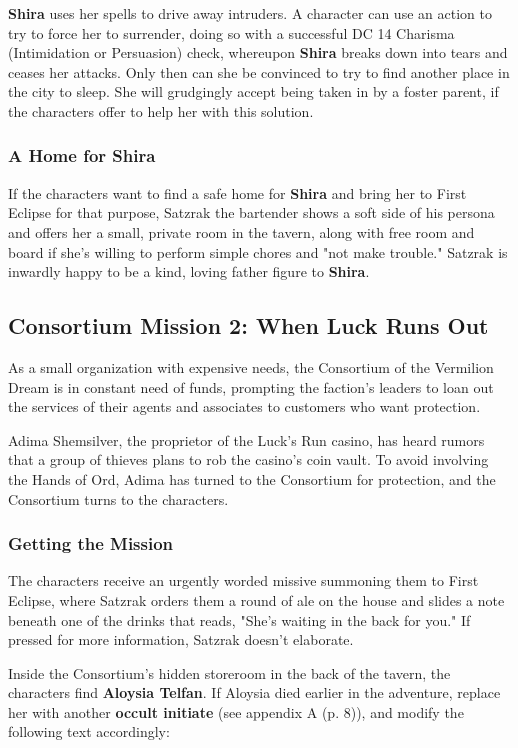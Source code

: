 \documentclass[a4paper, 11pt, bg=full, twocolumn, nooutline]{dndbook}
\begin{document}
\textbf{Shira} uses her spells to drive away intruders. A character can use an action to try to force her to surrender, doing so with a successful DC 14 Charisma (Intimidation or Persuasion) check, whereupon \textbf{Shira} breaks down into tears and ceases her attacks. Only then can she be convinced to try to find another place in the city to sleep. She will grudgingly accept being taken in by a foster parent, if the characters offer to help her with this solution.

\subsubsection{A Home for Shira}

If the characters want to find a safe home for \textbf{Shira} and bring her to First Eclipse for that purpose, Satzrak the bartender shows a soft side of his persona and offers her a small, private room in the tavern, along with free room and board if she's willing to perform simple chores and "not make trouble." Satzrak is inwardly happy to be a kind, loving father figure to \textbf{Shira}.

\subsection{Consortium Mission 2: When Luck Runs Out}

As a small organization with expensive needs, the Consortium of the Vermilion Dream is in constant need of funds, prompting the faction's leaders to loan out the services of their agents and associates to customers who want protection.

Adima Shemsilver, the proprietor of the Luck's Run casino, has heard rumors that a group of thieves plans to rob the casino's coin vault. To avoid involving the Hands of Ord, Adima has turned to the Consortium for protection, and the Consortium turns to the characters.

\subsubsection{Getting the Mission}

The characters receive an urgently worded missive summoning them to First Eclipse, where Satzrak orders them a round of ale on the house and slides a note beneath one of the drinks that reads, "She's waiting in the back for you." If pressed for more information, Satzrak doesn't elaborate.

Inside the Consortium's hidden storeroom in the back of the tavern, the characters find \textbf{Aloysia Telfan}. If Aloysia died earlier in the adventure, replace her with another \textbf{occult initiate} (see appendix A (p. 8)), and modify the following text accordingly:
\end{document}
